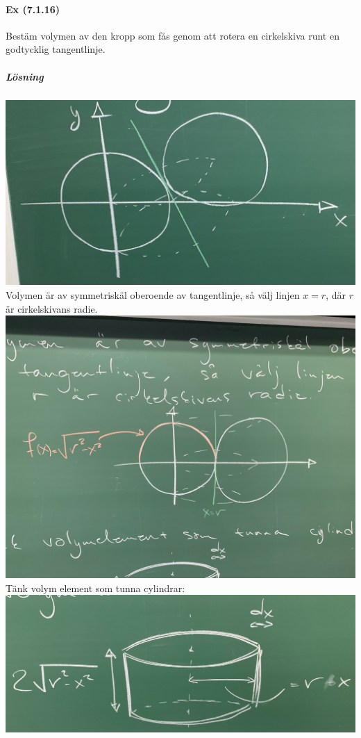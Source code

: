 \paragraph*{Ex (7.1.16)} Bestäm volymen av den kropp som fås genom att rotera en cirkelskiva runt en godtycklig tangentlinje.
\subparagraph{Lösning}
\includegraphics[scale=0.1]{lessons/lesson19/imgs/img06.jpg}
Volymen är av symmetriskäl oberoende av tangentlinje, så välj linjen $x=r$, där $r$ är cirkelskivans radie.
\includegraphics[scale=0.1]{lessons/lesson19/imgs/img07.jpg}
Tänk volym element som tunna cylindrar:
\includegraphics[scale=0.1]{lessons/lesson19/imgs/img08.jpg}
